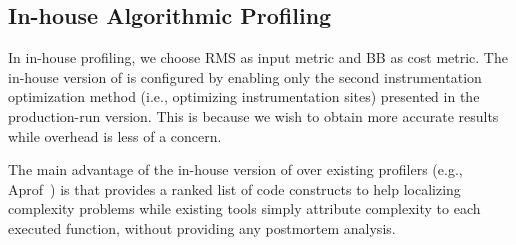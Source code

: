 \subsection{In-house Algorithmic Profiling}
\label{sec:in-house}


In in-house profiling, we choose RMS as input metric 
and BB as cost  metric.  
The in-house version of \Tool is configured by enabling
only the second instrumentation optimization method (i.e.,
optimizing instrumentation sites) presented 
in the production-run version. This is because we wish 
to obtain more accurate results while overhead is less of 
a concern.  

The main advantage of the in-house version of \Tool 
over existing profilers (e.g., Aprof~\cite{Aprof1,Aprof2}) is that 
\Tool provides a ranked list of code constructs to
help localizing complexity problems while 
existing tools simply attribute complexity to each executed function, 
without providing any postmortem analysis. 





